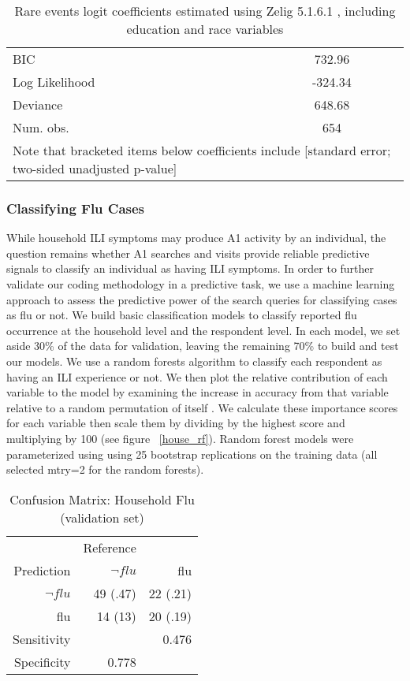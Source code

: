 \documentclass[12pt]{article}
\begin{document}
\begin{table}
\begin{center}
\begin{tabular}{l c }
BIC                    & 732.96            \\
Log Likelihood         & -324.34           \\
Deviance               & 648.68            \\
Num. obs.              & 654               \\
\hline
\multicolumn{2}{l}{\scriptsize{Note that bracketed items below coefficients include [standard error; two-sided unadjusted p-value]}}
\end{tabular}
\caption{Rare events logit coefficients estimated using Zelig 5.1.6.1 \citep{choirat_etal_2020}, including education and race variables}
\label{table:race_coefficients}
\end{center}
\end{table}

\subsubsection{Classifying Flu Cases}

While household ILI symptoms may produce A1 activity by an individual, the question remains whether A1 searches and visits provide reliable predictive signals to classify an individual as having ILI symptoms. In order to further validate our coding methodology in a predictive task, we use a machine learning approach to assess the predictive power of the search queries for classifying cases as flu or not. We build basic classification models to classify reported flu occurrence at the household level and the respondent level. In each model, we set aside 30\% of the data for validation, leaving the remaining 70\% to build and test our models. We use a random forests algorithm to classify each respondent as having an ILI experience or not. We then plot the relative contribution of each variable to the model by examining the increase in accuracy from that variable relative to a random permutation of itself \citet{breiman_2001random}. We calculate these importance scores for each variable then scale them by dividing by the highest score and multiplying by 100 \citep{kuhn_2008, kuhn_and_johnson_2013} (see figure ~\ref{house_rf}). Random forest models were parameterized using using 25 bootstrap replications on the training data (all selected mtry=2 for the random forests). 

\begin{table}[!htbp]
\centering
  \caption{Confusion Matrix: Household Flu (validation set)} 
  \label{classif1} 
\begin{tabular}{rrr}
  \hline
    & Reference &   \\
Prediction    &      $\neg{flu}$  &  flu\\
                $\neg{flu}$ & 49 (.47)  & 22 (.21)  \\
                          flu & 14 (13)  &  20 (.19) \\
   \hline
   Sensitivity &   &  0.476 \\
   Specificity & 0.778  &   \\
   \hline
\end{tabular}
\end{table}
\end{document}
